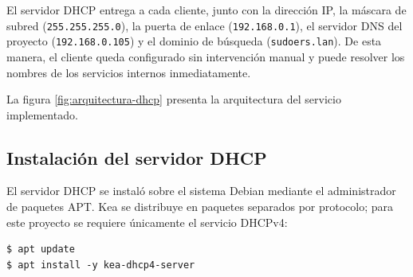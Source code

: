 El servidor DHCP entrega a cada cliente, junto con la dirección IP, la
máscara de subred (\texttt{255.255.255.0}), la puerta de enlace
(\texttt{192.168.0.1}), el servidor DNS del proyecto
(\texttt{192.168.0.105}) y el dominio de búsqueda (\texttt{sudoers.lan}).
De esta manera, el cliente queda configurado sin intervención manual y puede
resolver los nombres de los servicios internos inmediatamente.

La figura \ref{fig:arquitectura-dhcp} presenta la arquitectura del servicio
implementado.


\subsection{Instalación del servidor DHCP}

El servidor DHCP se instaló sobre el sistema Debian mediante el administrador
de paquetes APT. Kea se distribuye en paquetes separados por protocolo; para
este proyecto se requiere únicamente el servicio DHCPv4:

\begin{lstlisting}[style=terminal]
$ apt update
$ apt install -y kea-dhcp4-server
\end{lstlisting}

